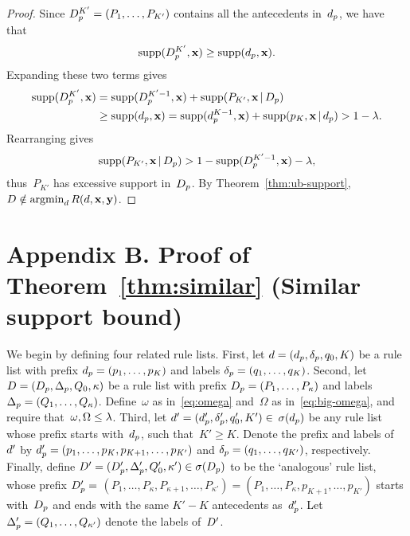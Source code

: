 \begin{proof}
Since ${D_p^{K'} = (P_1, \dots, P_{K'})}$
contains all the antecedents in~$d_p$, we have that
\begin{align*}
\textnormal{supp}(D_p^{K'}, \mathbf{x}) \ge \textnormal{supp}(d_p, \mathbf{x}).
\end{align*}
Expanding these two terms gives
\begin{align*}
\textnormal{supp}(D_p^{K'}, \mathbf{x})
&= \textnormal{supp}(D_p^{K'-1}, \mathbf{x}) + \textnormal{supp}(P_{K'}, \mathbf{x} \,|\, D_p) \\
&\ge \textnormal{supp}(d_p, \mathbf{x})
= \textnormal{supp}(d_p^{K-1}, \mathbf{x}) + \textnormal{supp}(p_K, \mathbf{x} \,|\, d_p)
> 1 - {\lambda}.
\end{align*}
Rearranging gives
\begin{align*}
\textnormal{supp}(P_{K'}, \mathbf{x} \,|\, D_p)
> 1 - \textnormal{supp}(D_p^{K'-1}, \mathbf{x}) - {\lambda},
\end{align*}
thus~$P_{K'}$ has excessive support in~$D_p$.
%
By Theorem~\ref{thm:ub-support},
${{D} \notin \operatorname*{argmin}_{{d}} R({d}, \mathbf{x}, \mathbf{y})}$.
\end{proof}

\section*{Appendix B. Proof of Theorem~\ref{thm:similar} (Similar support bound)}

We begin by defining four related rule lists.
%
First, let ${{d} = (d_p, \delta_p, q_0, K)}$
be a rule list with prefix ${d_p = (p_1, \dots, p_K)}$
and labels ${\delta_p = (q_1, \dots, q_K)}$.
%
Second, let ${{D} = (D_p, \Delta_p, Q_0, \kappa)}$
be a rule list with prefix ${D_p = (P_1, \dots, P_\kappa)}$
and labels ${\Delta_p = (Q_1, \dots, Q_\kappa)}$.
%
Define~$\omega$ as in~\eqref{eq:omega}
and~$\Omega$ as in~\eqref{eq:big-omega},
and require that~${\omega, \Omega \le {\lambda}}$.
%
Third, let ${{d}' = (d_p', \delta_p', q_0', K') \in}$
${\sigma(d_p)}$ be any rule list
whose prefix starts with~$d_p$, such that~${K' \ge K}$.
%
Denote the prefix and labels of~${d}'$ by
${d_p' = (p_1, \dots, p_K, p_{K+1}, \dots, p_{K'})}$
and ${\delta_p = (q_1, \dots, q_{K'})}$,
respectively.
%
Finally, define
${{D}' = (D_p', \Delta_p', Q_0', \kappa') \in \sigma(D_p)}$
to be the `analogous' rule list, \ie whose prefix
${D_p' =}$ ${(P_1, \dots, P_\kappa, P_{\kappa+1}, \dots, P_{\kappa'})
= (P_1, \dots, P_\kappa, p_{K+1}, \dots, p_{K'})}$
starts with~$D_p$ and ends with the same ${K'-K}$
antecedents as~$d_p'$.
%
Let ${\Delta_p' = (Q_1, \dots, Q_{\kappa'})}$
denote the labels of~${D}'$.

